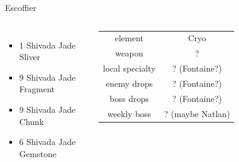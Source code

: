 \documentclass{beamer}
\begin{document}
\begin{frame}{Escoffier}
    \begin{columns}
\begin{itemize}
    \item 1 Shivada Jade Sliver
    \item 9 Shivada Jade Fragment
    \item 9 Shivada Jade Chunk
    \item 6 Shivada Jade Gemstone
\end{itemize}
\pause 
    \begin{tabular}{|c|c|}
\hline
element & Cryo\\
weapon & ? \\
local specialty & ? (Fontaine?)\\
enemy drops & ? (Fontaine?)\\
boss drops & ? (Fontaine?)\\
weekly boss & ? (maybe Natlan)\\\hline
    \end{tabular}
    \pause 


\end{columns}
\end{frame}
\end{document}
